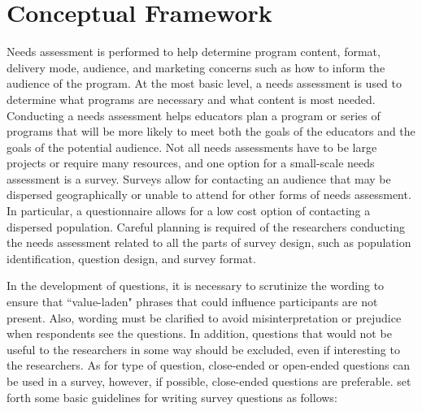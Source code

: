 \section{Conceptual Framework}
Needs assessment is performed to help determine program content, format, delivery mode, audience, and marketing concerns such as how to inform the audience of the program\citep{queeney}. At the most basic level, a needs assessment is used to determine what programs are necessary and what content is most needed. Conducting a needs assessment helps educators plan a program or series of programs that will be more likely to meet both the goals of the educators and the goals of the potential audience. Not all needs assessments have to be large projects or require many resources, and one option for a small-scale needs assessment is a survey. Surveys allow for contacting an audience that may be dispersed geographically or unable to attend for other forms of needs assessment\citep{queeney}. In particular, a questionnaire allows for a low cost option of contacting a dispersed population. Careful planning is required of the researchers conducting the needs assessment related to all the parts of survey design, such as population identification, question design, and survey format\citep{queeney}.
\par In the development of questions, it is necessary to scrutinize the wording to ensure that ``value-laden" phrases that could influence participants are not present\citep{queeney}. Also, wording must be clarified to avoid misinterpretation or prejudice when respondents see the questions. In addition, questions that would not be useful to the researchers in some way should be excluded, even if interesting to the researchers. As for type of question, close-ended or open-ended questions can be used in a survey, however, if possible, close-ended questions are preferable\citep{queeney}. \cite{queeney} set forth some basic guidelines for writing survey questions as follows:
